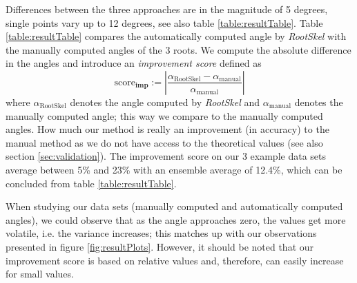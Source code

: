 Differences between the three approaches are in the magnitude of 5 degrees, single points vary up to 12 degrees, see also table \ref{table:resultTable}.
Table \ref{table:resultTable} compares the automatically computed angle by \textit{RootSkel} with the manually computed angles of the 3 roots. We compute the absolute difference in the angles and introduce an \textit{improvement score} defined as 
\[
 \text{score}_{\textbf{imp}} := | \frac{ \alpha_{\text{RootSkel}} - \alpha_{\text{manual}} }{\alpha_{\text{manual}}} |
\]
where $\alpha_{\text{RootSkel}}$ denotes the angle computed by \textit{RootSkel} and $\alpha_{\text{manual}}$ denotes the manually computed angle; this way we compare to the manually computed angles. How much our method is really an improvement (in accuracy) to the manual method %
as we do not have access to the theoretical values (see also section \ref{sec:validation}). The improvement score on our 3 example data sets average between 5\% and 23\% with an ensemble average of 12.4\%, which can be concluded from table \ref{table:resultTable}.

When studying our data sets (manually computed and automatically computed angles), we could observe that as the angle approaches zero, the values get more volatile, i.e. the variance increases; this matches up with our observations presented in figure \ref{fig:resultPlots}. However, it should be noted that our improvement score is based on relative values and, therefore, can easily increase for small values. %


